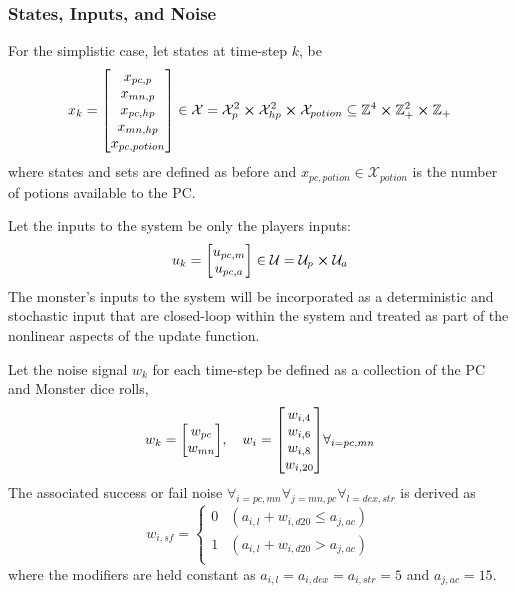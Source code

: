 \documentclass[letterpaper, 10 pt, conference]{ieeeconf}
\newcommand{\Z}{\mathbb{Z}}
\begin{document}
\subsubsection{States, Inputs, and Noise}
For the simplistic case, let states at time-step $k$, be \[
    x_k = \mqty[x_{pc,p}\\x_{mn,p}\\x_{pc,hp}\\x_{mn,hp}\\ x_{pc,potion}] 
    \in \mathcal{X} = \mathcal{X}_p^2 \cross \mathcal{X}_{hp}^2 \cross \mathcal{X}_{potion}
    \subseteq \Z^{4} \cross \Z_{+}^{2} \cross \Z_{+}
\] where states and sets are defined as before and $x_{pc,potion} \in \mathcal{X}_{potion}$ is the number of potions available to the PC.

Let the inputs to the system be only the players inputs: \[
    u_k = \mqty[u_{pc,m}\\u_{pc,a}] \in \mathcal{U} = \mathcal{U}_{p} \cross \mathcal{U}_{a} %
\] The monster's inputs to the system will be incorporated as a deterministic and stochastic input that are closed-loop within the system and treated as part of the nonlinear aspects of the update function.

Let the noise signal $w_k$ for each time-step be defined as a collection of the PC and Monster dice rolls, \[
    w_k = \mqty[w_{pc} \\ w_{mn}], \quad w_{i} = \mqty[w_{i,4} \\ w_{i,6} \\ w_{i,8} \\ w_{i,20}] \forall_{i = pc,mn}
\]The associated success or fail noise $\forall_{i=pc,mn} \forall_{j=mn,pc} \forall_{l = dex,str}$ is derived as \[
    w_{i,sf} = \begin{cases}
        0 & (a_{i,l} + w_{i,d20} \leq a_{j,ac})\\
        1 & (a_{i,l} + w_{i,d20} > a_{j,ac})\\
    \end{cases}
\] where the modifiers are held constant as $a_{i,l} = a_{i,dex} = a_{i,str} = 5$ and $a_{j,ac} = 15$.
\end{document}
